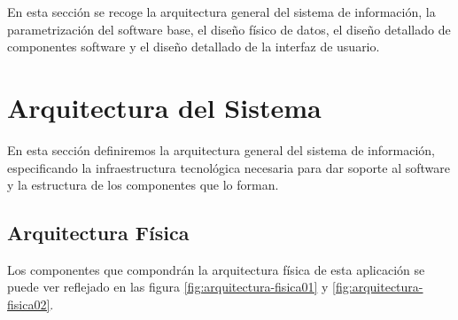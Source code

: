 

En esta sección se recoge la arquitectura general del sistema de información, la parametrización del software base, el diseño físico de datos, el diseño detallado de componentes software y el diseño detallado de la interfaz de usuario.

\section{Arquitectura del Sistema}
En esta sección definiremos la arquitectura general del sistema de información, especificando la infraestructura tecnológica necesaria para dar soporte al software y la estructura de los componentes que lo forman.


\subsection{Arquitectura Física}

Los componentes que compondrán la arquitectura física de esta aplicación se puede ver reflejado en las figura \ref{fig:arquitectura-fisica01} y \ref{fig:arquitectura-fisica02}.

